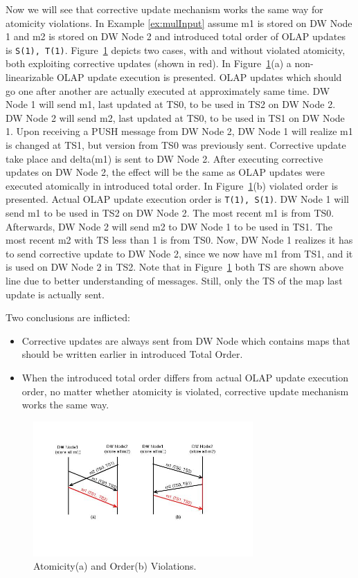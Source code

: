 \documentclass{sig-semester}
\def\OLAP{OLAP\xspace}
\def\EXORD{actual OLAP update execution order\xspace}
\begin{document}
Now we will see that corrective update mechanism works the same way for atomicity violations. In Example \ref{ex:mulInput} assume m1 is stored on DW Node 1 and m2 is stored on DW Node 2 and introduced total order of \OLAP updates is \texttt{S(1), T(1)}. Figure~\ref{fig:Atomicity} depicts two cases, with and without violated atomicity, both exploiting corrective updates (shown in red). In Figure~\ref{fig:Atomicity}(a) a non-linearizable \OLAP update execution is presented. \OLAP updates which should go one after another are actually executed at approximately same time. DW Node 1 will send m1, last updated at TS0, to be used in TS2 on DW Node 2. DW Node 2 will send m2, last updated at TS0, to be used in TS1 on DW Node 1. Upon receiving a PUSH message from DW Node 2, DW Node 1 will realize m1 is changed at TS1, but version from TS0 was previously sent. Corrective update take place and delta(m1) is sent to DW Node 2. After executing corrective updates on DW Node 2, the effect will be the same as \OLAP updates were executed atomically in introduced total order. In Figure~\ref{fig:Atomicity}(b) violated order is presented. Actual \OLAP update execution order is \texttt{T(1), S(1)}. DW Node 1 will send m1 to be used in TS2 on DW Node 2. The most recent m1 is from TS0. Afterwards, DW Node 2 will send m2 to DW Node 1 to be used in TS1. The most recent m2 with TS less than 1 is from TS0. Now, DW Node 1 realizes it has to send corrective update to DW Node 2, since we now have m1 from TS1, and it is used on DW Node 2 in TS2. Note that in Figure~\ref{fig:Atomicity} both TS are shown above line due to better understanding of messages. Still, only the TS of the map last update is actually sent.

Two conclusions are inflicted:
\begin{itemize}
 \item Corrective updates are always sent from DW Node which contains maps that should be written earlier in introduced Total Order.

 \item When the introduced total order differs from \EXORD, no matter whether atomicity is violated, corrective update mechanism works the same way. 
\end{itemize} 

\begin{figure}
\includegraphics[width=3.3in]{graphics/AtomicityOrder.jpg}
\vspace{-18mm}
\caption{Atomicity(a) and Order(b) Violations.}
\label{fig:Atomicity}
\vspace{-5mm}
\end{figure}
\end{document}
